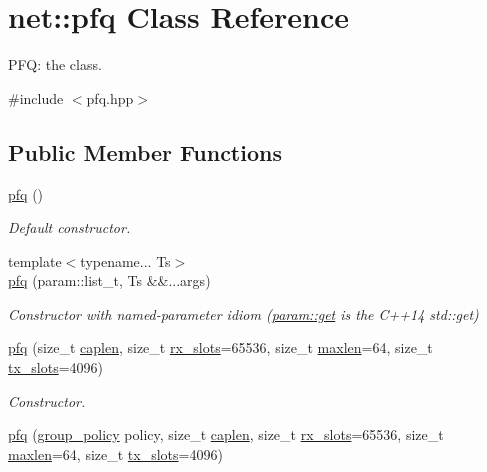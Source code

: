 \hypertarget{classnet_1_1pfq}{\section{net\+:\+:pfq Class Reference}
\label{classnet_1_1pfq}
}


P\+F\+Q\+: the class.  




{\ttfamily \#include $<$pfq.\+hpp$>$}

\subsection*{Public Member Functions}
\begin{DoxyCompactItemize}
\item 
\hyperlink{classnet_1_1pfq_a43214f93ed81a6344c83f991cb1311a7}{pfq} ()
\begin{DoxyCompactList}\small\item\em Default constructor. \end{DoxyCompactList}\item 
{\footnotesize template$<$typename... Ts$>$ }\\\hyperlink{classnet_1_1pfq_a886761849ccf9b22d3eac521c67a89ab}{pfq} (param\+::list\+\_\+t, Ts \&\&...args)
\begin{DoxyCompactList}\small\item\em Constructor with named-\/parameter idiom (\hyperlink{namespacenet_1_1param_a9020a1d5f00da972acbea3e809d3c602}{param\+::get} is the C++14 std\+::get) \end{DoxyCompactList}\item 
\hyperlink{classnet_1_1pfq_a939547eb013894e40b928b41f0f4c7b2}{pfq} (size\+\_\+t \hyperlink{classnet_1_1pfq_aa915603b2ad8d1226f9bbea0050945c0}{caplen}, size\+\_\+t \hyperlink{classnet_1_1pfq_a878c768492c68fc572a994a58913a3db}{rx\+\_\+slots}=65536, size\+\_\+t \hyperlink{classnet_1_1pfq_a0424e39990711493af4f24a0c3e9be4d}{maxlen}=64, size\+\_\+t \hyperlink{classnet_1_1pfq_aae98015b961c6210081fa29a2ea34da2}{tx\+\_\+slots}=4096)
\begin{DoxyCompactList}\small\item\em Constructor. \end{DoxyCompactList}\item 
\hyperlink{classnet_1_1pfq_a94152a94393370c372af90769111c52c}{pfq} (\hyperlink{namespacenet_aedc1a0dde937ddbd0800af02920b1067}{group\+\_\+policy} policy, size\+\_\+t \hyperlink{classnet_1_1pfq_aa915603b2ad8d1226f9bbea0050945c0}{caplen}, size\+\_\+t \hyperlink{classnet_1_1pfq_a878c768492c68fc572a994a58913a3db}{rx\+\_\+slots}=65536, size\+\_\+t \hyperlink{classnet_1_1pfq_a0424e39990711493af4f24a0c3e9be4d}{maxlen}=64, size\+\_\+t \hyperlink{classnet_1_1pfq_aae98015b961c6210081fa29a2ea34da2}{tx\+\_\+slots}=4096)

\end{DoxyCompactItemize}

